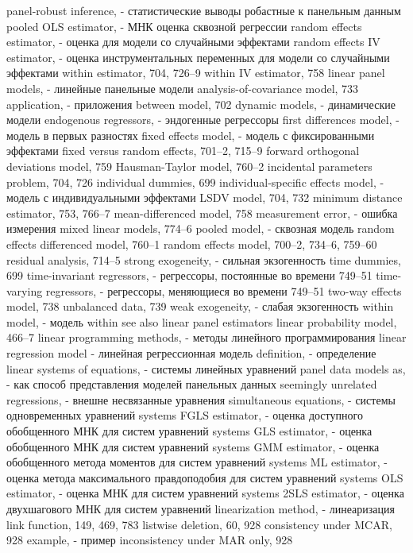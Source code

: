 panel-robust inference, - статистические выводы робастные к панельным данным
pooled OLS estimator, - МНК оценка сквозной регрессии
random effects estimator, - оценка для модели со случайными эффектами
random effects IV estimator, - оценка инструментальных переменных для модели со случайными эффектами
within estimator, 704, 726–9
within IV estimator, 758
linear panel models, - линейные панельные модели
analysis-of-covariance model, 733 
application, - приложения
between model, 702
dynamic models, - динамические модели
endogenous regressors, - эндогенные регрессоры
first differences model, - модель в первых разностях
fixed effects model, - модель с фиксированными эффектами 
fixed versus random effects, 701–2, 715–9 forward orthogonal deviations model, 759 Hausman-Taylor model, 760–2
incidental parameters problem, 704, 726 individual dummies, 699
individual-specific effects model, - модель с индивидуальными эффектами
LSDV model, 704, 732
minimum distance estimator, 753, 766–7 
mean-differenced model, 758
measurement error, - ошибка измерения
mixed linear models, 774–6
pooled model, - сквозная модель
random effects differenced model, 760–1 random effects model, 700–2, 734–6, 759–60 residual analysis, 714–5
strong exogeneity, - сильная экзогенность
time dummies, 699
time-invariant regressors, - регрессоры, постоянные во времени 
749–51 time-varying regressors, - регрессоры, меняющиеся во времени 
749–51 two-way effects model, 738
unbalanced data, 739
weak exogeneity, - слабая экзогенность
within model, - модель within
see also linear panel estimators
linear probability model, 466–7 
linear programming methods, - методы линейного программирования 
linear regression model - линейная регрессионная модель
definition, - определение
linear systems of equations, - системы линейных уравнений
panel data models as, - как способ представления моделей панельных данных
seemingly unrelated regressions, - внешне несвязанные уравнения
simultaneous equations, - системы одновременных уравнений 
systems FGLS estimator, - оценка доступного обобщенного МНК для систем уравнений
systems GLS estimator, - оценка обобщенного МНК для систем уравнений
systems GMM estimator, - оценка обобщенного метода моментов для систем уравнений
systems ML estimator, - оценка  метода максимального правдоподобия для систем уравнений 
systems OLS estimator, - оценка МНК для систем уравнений
systems 2SLS estimator, - оценка двухшагового МНК для систем уравнений
linearization method, - линеаризация
link function, 149, 469, 783 
listwise deletion, 60, 928
consistency under MCAR, 928 
example, - пример
inconsistency under MAR only, 928
